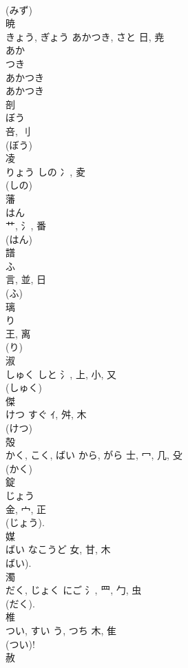 \documentclass[8pt]{extreport}
\begin{document}
\begin{CJK}{UTF8}{min}
\\	(みず) 
\\	暁	
\\	きょう, ぎょう	あかつき, さと	日, 尭	
\\	あか 
\\	つき 
\\	あかつき 
\\	あかつき 
\\	剖	
\\	ぼう	
\\	咅, 刂	
\\	(ぼう) 
\\	凌	
\\	りょう	しの	冫, 夌	
\\	(しの) 
\\	藩	
\\	はん	
\\	艹, 氵, 番	
\\	(はん) 
\\	譜	
\\	ふ	
\\	言, 並, 日	
\\	(ふ) 
\\	璃	
\\	り	
\\	王, 离	
\\	(り) 
\\	淑	
\\	しゅく	しと	氵, 上, 小, 又	
\\	(しゅく) 
\\	傑	
\\	けつ	すぐ	ｲ, 舛, 木	
\\	(けつ) 
\\	殻	
\\	かく, こく, ばい	から, がら	士, 冖, 几, 殳	
\\	(かく) 
\\	錠	
\\	じょう	
\\	金, 宀, 正	
\\	(じょう).	
\\	媒	
\\	ばい	なこうど	女, 甘, 木	
\\	ばい).
\\	濁	
\\	だく, じょく	にご	氵, 罒, 勹, 虫	
\\	(だく). 
\\	椎	
\\	つい, すい	う, つち	木, 隹	
\\	(つい)!
\\	赦	

\end{CJK}
\end{document}
